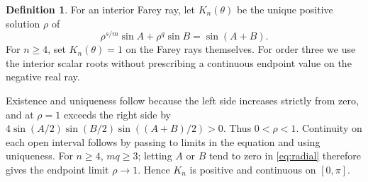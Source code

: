 \documentclass[11pt,a4paper]{article}
\theoremstyle{definition}
\newtheorem{definition}[theorem]{Definition}
\theoremstyle{remark}
\numberwithin{equation}{section}
\begin{document}
\begin{definition}\label{def:candidate}
For an interior Farey ray, let $K_n(\theta)$ be the unique positive solution $\rho$ of
\begin{equation}\label{eq:radial}
 \rho^{s/m}\sin A+\rho^q\sin B=\sin(A+B).
\end{equation}
For $n\ge4$, set $K_n(\theta)=1$ on the Farey rays themselves.
For order three we use the interior scalar roots without prescribing a continuous endpoint value on the negative real ray.
\end{definition}
Existence and uniqueness follow because the left side increases strictly from zero, and at $\rho=1$ exceeds the right side by
$4\sin(A/2)\sin(B/2)\sin((A+B)/2)>0$.
Thus $0<\rho<1$.
Continuity on each open interval follows by passing to limits in the equation and using uniqueness.
For $n\ge4$, $mq\ge3$; letting $A$ or $B$ tend to zero in \eqref{eq:radial} therefore gives the endpoint limit $\rho\to1$.
Hence $K_n$ is positive and continuous on $[0,\pi]$.
\end{document}
